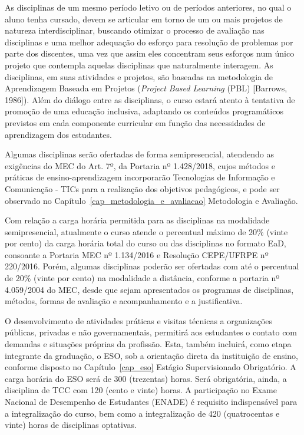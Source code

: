 \documentclass[
	12pt,				%
	openright,			%
  oneside,     %
	a4paper,			%
	chapter=TITLE,		%
	english,			%
	french,				%
	spanish,			%
	brazil				%
	]{abntex2}
\begin{document}
  As disciplinas de um mesmo período letivo ou de períodos anteriores, no qual o aluno tenha cursado, devem se articular em torno de um ou mais projetos de natureza interdisciplinar, buscando otimizar o processo de avaliação nas disciplinas e uma melhor adequação do esforço para resolução de problemas por parte dos discentes, uma vez que assim eles concentram seus esforços num único projeto que contempla aquelas disciplinas que naturalmente interagem. As disciplinas, em suas atividades e projetos, são baseadas na metodologia de Aprendizagem Baseada em Projetos (\textit{Project Based Learning} (PBL) [Barrows, 1986]). Além do diálogo entre as disciplinas, o curso estará atento à tentativa de promoção de uma educação inclusiva, adaptando os conteúdos programáticos previstos em cada componente curricular em função das necessidades de aprendizagem dos estudantes.
  
  Algumas disciplinas serão ofertadas de forma semipresencial, atendendo as exigências do MEC do Art. 7º, da Portaria nº 1.428/2018, cujos métodos e práticas de ensino-aprendizagem incorporarão Tecnologias de Informação e Comunicação - TICs para a realização dos objetivos pedagógicos, e pode ser observado no Capítulo~\ref{cap_metodologia_e_avaliacao} Metodologia e Avaliação.
  
  Com relação a carga horária permitida para as disciplinas na modalidade semipresencial, atualmente o curso atende o percentual máximo de 20\% (vinte por cento) da carga horária total do curso ou das disciplinas no formato EaD, consoante a Portaria MEC nº 1.134/2016 e Resolução CEPE/UFRPE nº 220/2016. Porém, algumas disciplinas poderão ser ofertadas com até o percentual de 20\% (vinte por cento) na modalidade a distância, conforme a portaria nº 4.059/2004 do MEC, desde que sejam apresentados os programas de disciplinas, métodos, formas de avaliação e acompanhamento e a justificativa.
  
  O desenvolvimento de atividades práticas e visitas técnicas a organizações públicas, privadas e não governamentais, permitirá aos estudantes o contato com demandas e situações próprias da profissão. Esta, também incluirá, como etapa integrante da graduação, o ESO, sob a orientação direta da instituição de ensino, conforme disposto no Capítulo~\ref{cap_eso} Estágio Supervisionado Obrigatório. A carga horária do ESO será de 300 (trezentas) horas. Será obrigatória, ainda, a disciplina de TCC com 120 (cento e vinte) horas. A participação no Exame Nacional de Desempenho de Estudantes (ENADE) é requisito indispensável para a integralização do curso, bem como a integralização de 420 (quatrocentas e vinte) horas de disciplinas optativas.
  
\end{document}
